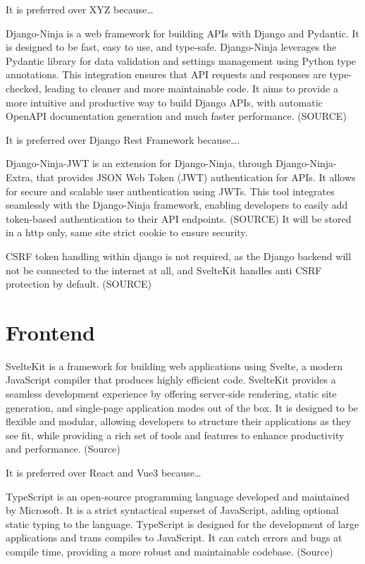 It is preferred over XYZ because…

Django-Ninja is a web framework for building APIs with Django and Pydantic. It is designed to be fast, easy to use, and type-safe. Django-Ninja leverages the Pydantic library for data validation and settings management using Python type annotations. This integration ensures that API requests and responses are type-checked, leading to cleaner and more maintainable code. It aims to provide a more intuitive and productive way to build Django APIs, with automatic OpenAPI documentation generation and much faster performance. (SOURCE)

It is preferred over Django Rest Framework because….

Django-Ninja-JWT is an extension for Django-Ninja, through Django-Ninja-Extra, that provides JSON Web Token (JWT) authentication for APIs. It allows for secure and scalable user authentication using JWTs. This tool integrates seamlessly with the Django-Ninja framework, enabling developers to easily add token-based authentication to their API endpoints. (SOURCE) It will be stored in a http only, same site strict cookie to ensure security. 

CSRF token handling within django is not required, as the Django backend will not be connected to the internet at all, and SvelteKit handles anti CSRF protection by default. (SOURCE)

\section{Frontend}
SvelteKit is a framework for building web applications using Svelte, a modern JavaScript compiler that produces highly efficient code. SvelteKit provides a seamless development experience by offering server-side rendering, static site generation, and single-page application modes out of the box. It is designed to be flexible and modular, allowing developers to structure their applications as they see fit, while providing a rich set of tools and features to enhance productivity and performance. (Source)

It is preferred over React and Vue3 because…

TypeScript is an open-source programming language developed and maintained by Microsoft. It is a strict syntactical superset of JavaScript, adding optional static typing to the language. TypeScript is designed for the development of large applications and trans compiles to JavaScript. It can catch errors and bugs at compile time, providing a more robust and maintainable codebase. (Source)


